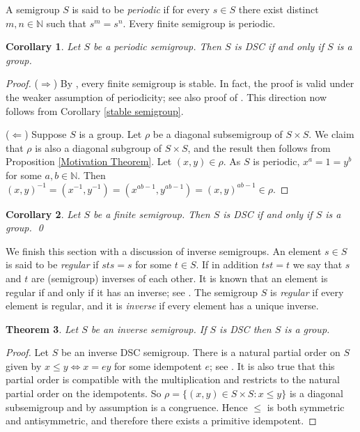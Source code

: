 \documentclass[a4paper, 12pt,reqno]{amsart}
\theoremstyle{plain}
\newtheorem{thm}{Theorem}[section]
\newtheorem{cor}[thm]{Corollary}
\theoremstyle{definition}
\theoremstyle{remark}
\newcommand{\N}{\mathbb{N}}
\begin{document}
A semigroup $S$ is said to be \emph{periodic} if for every $s\in S$ there exist distinct $m,n\in\N$ such that $s^m=s^n$. Every finite semigroup is periodic. 

\begin{cor}\label{periodic semigroup}
    Let $S$ be a periodic semigroup. Then $S$ is DSC  if and only if $S$ is a group.
\end{cor}

\begin{proof}
($\Rightarrow$)
By \cite[Theorem A.2.4]{RS09}, every finite semigroup is stable. In fact, the proof is valid under the weaker assumption of periodicity; see also proof of \cite[Corollary 3.1]{An65}. 
This direction now follows from Corollary \ref{stable semigroup}.

($\Leftarrow$)
    Suppose $S$ is a group. Let $\rho$ be a diagonal subsemigroup of $S \times S$. We claim that $\rho$ is also a diagonal subgroup of $S \times S$, and the result then follows from Proposition \ref{Motivation Theorem}. Let $(x,y) \in \rho$. As $S$ is periodic, $x^a = 1 = y^b$ for some $a,b \in \N$. Then $(x,y)^{-1} = (x^{-1},y^{-1}) = (x^{ab - 1},y^{ab - 1}) = (x,y)^{ab-1} \in \rho$.
\end{proof}


\begin{cor}\label{finite semigroup}
    Let $S$ be a finite semigroup. Then $S$ is DSC  if and only if $S$ is a group.
    \qed
\end{cor}

We finish this section with a discussion of inverse semigroups.
An element $s\in S$ is said to be \emph{regular} if $sts=s$ for some $t\in S$.
If in addition $tst=t$ we say that $s$ and $t$ are (semigroup) inverses of each other.
It is known that an element is regular if and only if it has an inverse; see \cite[p.~51]{Ho95}.
The semigroup $S$ is \emph{regular} if every element is regular, and it is \emph{inverse} if every element has a unique inverse.


\begin{thm}\label{Inverse semigroup}
    Let $S$ be an inverse semigroup. If $S$ is DSC then $S$ is a group.
\end{thm}

\begin{proof}
    Let $S$ be an inverse DSC semigroup. There is a natural partial order on $S$ given by $x \leq y \iff x = ey$ for some idempotent $e$; see \cite[Section 5.2]{Ho95}. It is also true that this partial order is compatible with the multiplication and restricts to the natural partial order on the idempotents.
    So $\rho = \{ (x,y) \in S \times S \colon  x \leq y \}$ is a diagonal subsemigroup and by assumption is a congruence. Hence $\leq$ is both symmetric and antisymmetric, and therefore there exists a primitive idempotent.
\end{proof}
\end{document}

